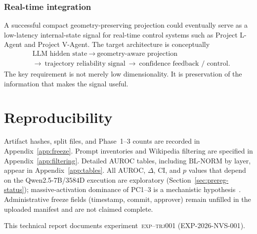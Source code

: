 \documentclass{article}
\newcommand{\blnorm}{\mathrm{BL\text{-}NORM}}
\newcommand{\exptag}{\textsc{exp--trj001}}
\begin{document}
\subsubsection{Real-time integration}
A successful compact geometry-preserving projection could eventually serve as a low-latency internal-state signal for real-time control systems such as Project {L-Agent} and Project {V-Agent}.
The target architecture is conceptually
\begin{equation}
\begin{aligned}
  &\text{{LLM} hidden state}
  \ \rightarrow\
  \text{geometry-aware projection}\\
  &\rightarrow\
  \text{trajectory reliability signal}
  \ \rightarrow\
  \text{confidence feedback / control}.
\end{aligned}
\end{equation}
The key requirement is not merely low dimensionality. It is preservation of the information that makes the signal useful.

\section{Reproducibility}
\label{sec:repro}

Artifact hashes, split files, and Phase~1--3 counts are recorded in Appendix~\ref{app:freeze}. Prompt inventories and Wikipedia filtering are specified in Appendix~\ref{app:filtering}. Detailed {AUROC} tables, including $\blnorm$ by layer, appear in Appendix~\ref{app:tables}.
All {AUROC}, $\Delta$, {CI}, and $p$ values that depend on the {Qwen2.5-7B}/$3584${D} execution are exploratory (Section~\ref{sec:prereg-status}); massive-activation dominance of {PC1}--{3} is a mechanistic hypothesis~\citep{nosek2018prereg,simmons2011false,sun2024massive}.
Administrative freeze fields (timestamp, commit, approver) remain unfilled in the uploaded manifest and are not claimed complete.

\begin{ack}
This technical report documents experiment~\exptag{} ({EXP-2026-NVS-001}).
\end{ack}




\appendix
\end{document}
